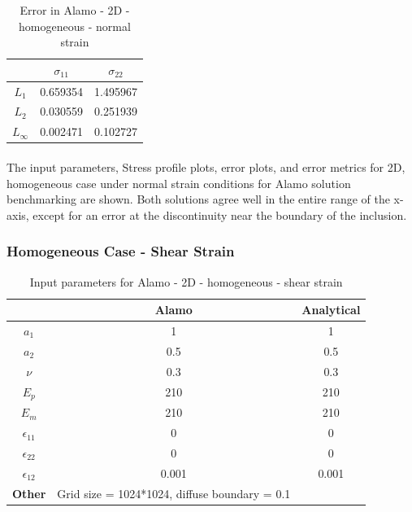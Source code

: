\documentclass[12pt, a4paper]{report}
\begin{document}
\begin{table}[H]
    \centering
    \begin{tabular}{|c|c|c|}
        \hline
        &\textbf{$\sigma_{11}$} &  \textbf{$\sigma_{22}$} \\
        \hline
        $L_1$ & 0.659354 & 1.495967 \\
        \hline
        $L_2$ & 0.030559 & 0.251939  \\
        \hline 
        $L_\infty$ & 0.002471 & 0.102727 \\
        \hline
    \end{tabular}
    \caption{Error in Alamo - 2D - homogeneous - normal strain}
\end{table}

\paragraph{}
The input parameters, Stress profile plots, error plots, and error metrics for 2D, homogeneous case under normal strain conditions for Alamo solution benchmarking are shown. Both solutions agree well in the entire range of the x-axis, except for an error at the discontinuity near the boundary of the inclusion.


\newpage

\subsubsection{Homogeneous Case - Shear Strain}
\begin{table}[H]
    \centering
    \begin{tabular}{|c|c|c|}
        \hline
        & \textbf{Alamo} &\textbf{Analytical}\\
        \hline
        \textbf{$a_1$} & 1 & 1 \\
        \hline
        \textbf{$a_2$} & 0.5 & 0.5 \\
        \hline
        \textbf{$\nu$} & 0.3 & 0.3 \\
        \hline
        \textbf{$E_p$} & 210 & 210 \\
        \hline
        \textbf{$E_m$} & 210 & 210 \\
        \hline
        \textbf{$\epsilon_{11}$} & 0 & 0 \\
        \hline
        \textbf{$\epsilon_{22}$} & 0 & 0 \\
        \hline
        \textbf{$\epsilon_{12}$} & 0.001 & 0.001 \\
        \hline
        \textbf{Other} & Grid size = 1024*1024, diffuse boundary = 0.1&  \\
        \hline
    \end{tabular}
    \caption{Input parameters for Alamo - 2D - homogeneous - shear strain}
\end{table}
\end{document}
